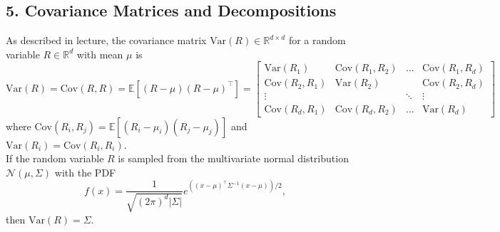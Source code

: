 \documentclass{article}
\renewcommand{\N}{\mathcal{N}}
\renewcommand{\R}{\mathbb{R}}
\newcommand{\E}{\mathbb{E}}
\newcommand{\Var}{\text{Var}}
\newcommand{\Cov}{\text{Cov}}
\begin{document}
\newpage
\subsection*{5. Covariance Matrices and Decompositions}
As described in lecture, the covariance matrix $\text{Var}(R) \in \R^{d\times d}$ for a random variable $R \in \R^d$ with mean $\mu$ is
$$
\text{Var}(R) = \text{Cov}(R, R) = \E[(R- \mu)(R-\mu)^{\top}] =
\begin{bmatrix}
\Var(R_1) & \Cov(R_1, R_2) & \ldots & \Cov(R_1, R_d) \\
\Cov(R_2, R_1) & \Var(R_2) & & \Cov(R_2, R_d) \\
\vdots & & \ddots & \vdots \\
\Cov(R_d, R_1) & \Cov(R_d, R_2) & \ldots & \Var(R_d)
\end{bmatrix}
$$
where $\Cov(R_i, R_j) = \E[(R_i - \mu_i)(R_j - \mu_j)]$ and $\Var(R_i) = \Cov(R_i, R_i)$. \\

\noindent
If the random variable $R$ is sampled from the multivariate normal distribution $\N(\mu, \Sigma)$ with the PDF
$$ f(x) = \frac{1}{\sqrt{(2\pi)^d |\Sigma|}} e^{((x-\mu)^{\top}\Sigma^{-1}(x-\mu))/2},$$
then $\Var(R) = \Sigma$.\\
\end{document}
